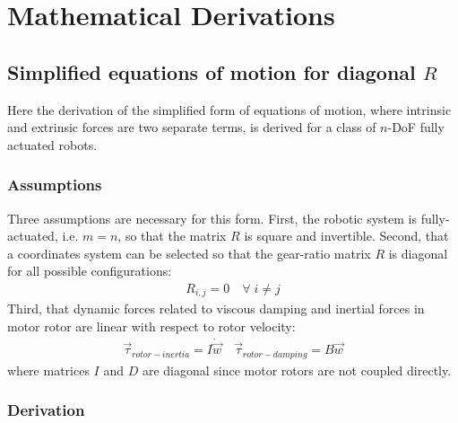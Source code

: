 \chapter{Mathematical Derivations}
\label{sec:proofs}


\section{Simplified equations of motion for diagonal $R$}
\label{sec:Rdiagndof}

Here the derivation of the simplified form of equations of motion, where intrinsic and extrinsic forces are two separate terms, is derived for a class of $n$-DoF fully actuated robots.

\subsection{Assumptions} 

Three assumptions are necessary for this form. First, the robotic system is fully-actuated, i.e. $m=n$, so that the matrix $R$ is square and invertible. Second, that a coordinates system can be selected so that the gear-ratio matrix $R$ is diagonal for all possible configurations:
%
\begin{align}
R_{i,j} = 0 \quad \forall \; i \neq j
\end{align}
%
Third, that dynamic forces related to viscous damping and inertial forces in motor rotor are linear with respect to rotor velocity:
%
\begin{align}
\vec{\tau}_{rotor-inertia} = I \dot{\vec{w}}  \quad  \vec{\tau}_{rotor-damping} = B \vec{w}
\end{align}
%
where  matrices $I$ and $D$ are diagonal since motor rotors are not coupled directly. 

\subsection{Derivation}

